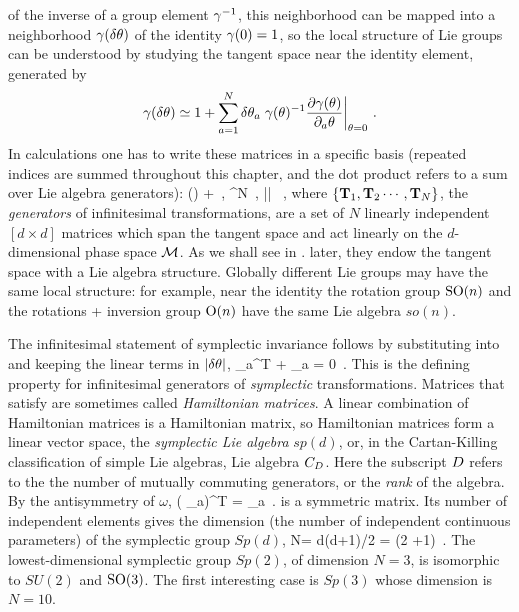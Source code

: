 of the inverse of a group element $\gamma^{-1}$, this neighborhood can be
mapped into a neighborhood $\gamma(\delta\theta)$ of the identity
$\gamma(0)=1$, so the local structure of Lie groups can be understood by
studying the tangent space near the identity element, generated by
\[
\gamma(\delta\theta) \simeq 1
+ \sum_{a=1}^N \delta\theta_a \left.
	\gamma(\theta)^{-1}
	\frac{\partial \gamma(\theta)}{\partial_a \theta}
		\right|_{\theta=0}
\,.
\]
In calculations one has to write these matrices in a specific basis
(repeated indices are summed throughout this
chapter, and the dot product refers to a sum over
Lie algebra generators):
\beq
\LieEl(\delta\gSpace)  + \delta \gSpace \cdot \Lg
    \,,\quad
\delta\gSpace \in \reals^N
    \,,\quad
|\delta \gSpace| 
    \, ,
where $\{\mathbf{T}_1,\mathbf{T}_2\cdots,\mathbf{T}_N\}$, the {\em generators} of
infinitesimal transformations, are a set of $N$ linearly independent
$[d\!\times\!d]$ matrices which span the tangent space and act linearly
on the $d$-dim\-ens\-ion\-al phase space ${\cal M}$. As we shall see
	   \ifdasbuch
in .
		\else
later,
		\fi
they endow the tangent space with a Lie algebra structure. Globally
different Lie groups may have the same local structure: for example, near
the identity the rotation group $\textrm{SO}(n)$ and
the rotations + inversion group $\textrm{O}(n)$ have the same Lie algebra $so(n)$.

The infinitesimal statement of symplectic invariance follows by
substituting  into  and keeping
the linear terms in $|\delta \theta|$,
\beq
 \Lg_a^T {\bf \omega} + {\bf \omega} \Lg_a = 0
\,.
This is the defining property for infinitesimal generators of {\em
symplectic} transformations. Matrices that satisfy  are
sometimes called \emph{Hamiltonian matrices}. A linear combination  of
Hamiltonian matrices is a Hamiltonian matrix, so Hamiltonian matrices
form a linear vector space, the \emph{symplectic Lie algebra} $sp(d)$,
or, in the Cartan-Killing classification of simple Lie algebras, Lie
algebra $C_{D}$. Here the subscript $D$ refers to the the number of
mutually commuting generators, or the \emph{rank} of the algebra. By the
antisymmetry of $\omega$,
    
\beq
({\bf \omega} \Lg_a)^T = {\bf \omega} \Lg_a
\,.
is a symmetric matrix. Its number of independent elements gives the
dimension (the number of independent continuous parameters) of the
symplectic group $Sp(d)$,
\beq
N= {d(d+1)}/{2} = \DOF (2 \DOF+1)
\,.
The lowest-dimensional symplectic group $Sp(2)$, of dimension $N=3$,
is isomorphic to $SU(2)$ and $\textrm{SO}(3)$. The first interesting case is
$Sp(3)$ whose dimension is $N=10$.


